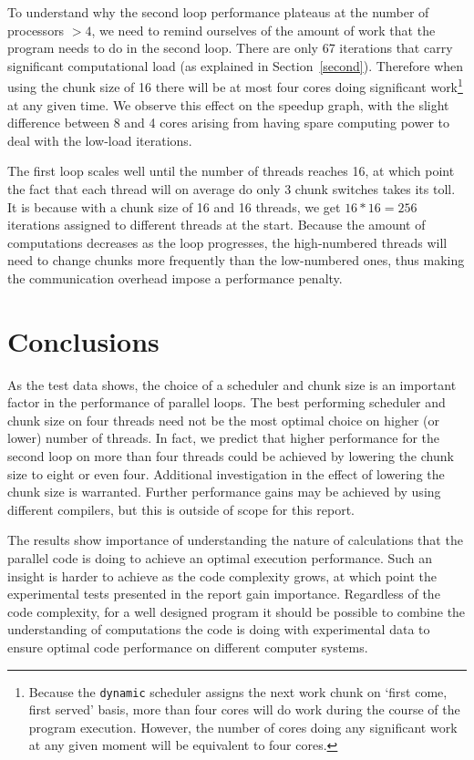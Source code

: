 \documentclass[11pt,a4paper]{article}
\begin{document}
To understand why the second loop performance plateaus at the number of processors \( > 4\), we need to remind ourselves of the amount of work that the program needs to do in the second loop. There are only 67 iterations that carry significant computational load (as explained in Section~\ref{second}). Therefore when using the chunk size of 16 there will be at most four cores doing significant work\footnote{Because the \texttt{dynamic} scheduler assigns the next work chunk on `first come, first served' basis, more than four cores will do work during the course of the program execution. However, the number of cores doing any significant work at any given moment will be equivalent to four cores.} at any given time. We observe this effect on the speedup graph, with the slight difference between 8 and 4 cores arising from having spare computing power to deal with the low-load iterations.

The first loop scales well until the number of threads reaches 16, at which point the fact that each thread will on average do only 3 chunk switches takes its toll. It is because with a chunk size of 16 and 16 threads, we get \(16 * 16 = 256\) iterations assigned to different threads at the start. Because the amount of computations decreases as the loop progresses, the high-numbered threads will need to change chunks more frequently than the low-numbered ones, thus making the communication overhead impose a performance penalty.

\section{Conclusions}
As the test data shows, the choice of a scheduler and chunk size is an important factor in the performance of parallel loops. The best performing scheduler and chunk size on four threads need not be the most optimal choice on higher (or lower) number of threads. In fact, we predict that higher performance for the second loop on more than four threads could be achieved by lowering the chunk size to eight or even four. Additional investigation in the effect of lowering the chunk size is warranted. Further performance gains may be achieved by using different compilers, but this is outside of scope for this report. 

The results show importance of understanding the nature of calculations that the parallel code is doing to achieve an optimal execution performance. Such an insight is harder to achieve as the code complexity grows, at which point the experimental tests presented in the report gain importance. Regardless of the code complexity, for a well designed program it should be possible to combine the understanding of computations the code is doing with experimental data to ensure optimal code performance on different computer systems.
\end{document}
